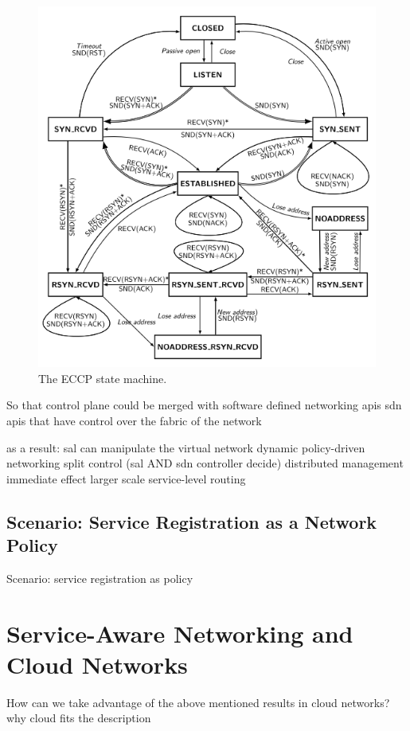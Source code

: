 \documentclass[12pt,a4paper,oneside]{article}
\begin{document}
\begin{figure}
\centering
{}
\includegraphics[scale=0.6]{figures/ECCP_sm}
\caption[The ECCP state machine]{The ECCP \cite{Arye2012} state machine.}
\end{figure}

So that control plane could be merged with software defined networking apis
sdn apis that have control over the fabric of the network

as a result: sal can manipulate the virtual network
dynamic policy-driven networking
split control (sal AND sdn controller decide)
distributed management
immediate effect
larger scale service-level routing

\subsection{Scenario: Service Registration as a Network Policy}
Scenario:
service registration as policy


\newpage
\section{Service-Aware Networking and Cloud Networks}
How can we take advantage of the above mentioned results in cloud networks?
why cloud fits the description
\end{document}
